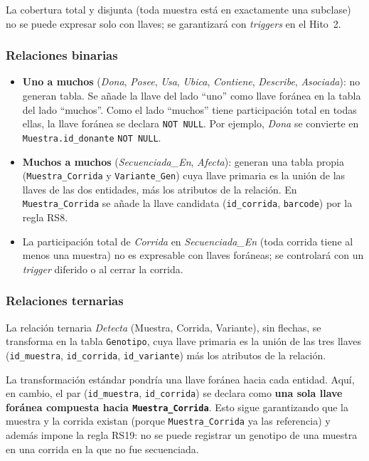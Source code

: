 \documentclass[11pt,a4paper]{article}
\newcommand{\tb}[1]{\texttt{#1}}
\begin{document}
La cobertura total y disjunta (toda muestra está en exactamente una subclase) no se puede expresar solo con llaves; se garantizará con \emph{triggers} en el Hito~2.

\subsubsection{Relaciones binarias}

\begin{itemize}
  \item \textbf{Uno a muchos} (\emph{Dona}, \emph{Posee}, \emph{Usa}, \emph{Ubica}, \emph{Contiene}, \emph{Describe}, \emph{Asociada}): no generan tabla. Se añade la llave del lado ``uno'' como llave foránea en la tabla del lado ``muchos''. Como el lado ``muchos'' tiene participación total en todas ellas, la llave foránea se declara \tb{NOT NULL}. Por ejemplo, \emph{Dona} se convierte en \tb{Muestra.id\_donante} \tb{NOT NULL}.
  \item \textbf{Muchos a muchos} (\emph{Secuenciada\_En}, \emph{Afecta}): generan una tabla propia (\tb{Muestra\_Corrida} y \tb{Variante\_Gen}) cuya llave primaria es la unión de las llaves de las dos entidades, más los atributos de la relación. En \tb{Muestra\_Corrida} se añade la llave candidata (\tb{id\_corrida}, \tb{barcode}) por la regla RS8.
  \item La participación total de \emph{Corrida} en \emph{Secuenciada\_En} (toda corrida tiene al menos una muestra) no es expresable con llaves foráneas; se controlará con un \emph{trigger} diferido o al cerrar la corrida.
\end{itemize}

\subsubsection{Relaciones ternarias}
\label{sec:ternaria}

La relación ternaria \emph{Detecta} (Muestra, Corrida, Variante), sin flechas, se transforma en la tabla \tb{Genotipo}, cuya llave primaria es la unión de las tres llaves (\tb{id\_muestra}, \tb{id\_corrida}, \tb{id\_variante}) más los atributos de la relación.

La transformación estándar pondría una llave foránea hacia cada entidad. Aquí, en cambio, el par (\tb{id\_muestra}, \tb{id\_corrida}) se declara como \textbf{una sola llave foránea compuesta hacia \tb{Muestra\_Corrida}}. Esto sigue garantizando que la muestra y la corrida existan (porque \tb{Muestra\_Corrida} ya las referencia) y además impone la regla RS19: no se puede registrar un genotipo de una muestra en una corrida en la que no fue secuenciada.
\end{document}
